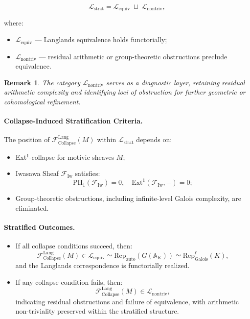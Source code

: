 \documentclass[11pt]{article}
\newtheorem{remark}[theorem]{Remark}
\begin{document}
\[
\mathcal{L}_{\mathrm{strat}} = \mathcal{L}_{\mathrm{equiv}} \;\sqcup\; \mathcal{L}_{\mathrm{nontriv}},
\]

where:

\begin{itemize}
    \item \( \mathcal{L}_{\mathrm{equiv}} \) — Langlands equivalence holds functorially;
    \item \( \mathcal{L}_{\mathrm{nontriv}} \) — residual arithmetic or group-theoretic obstructions preclude equivalence.
\end{itemize}

\begin{remark}
The category \( \mathcal{L}_{\mathrm{nontriv}} \) serves as a diagnostic layer,  
retaining residual arithmetic complexity and identifying loci of obstruction  
for further geometric or cohomological refinement.
\end{remark}

\paragraph{Collapse-Induced Stratification Criteria.}

The position of \( \mathcal{F}_{\mathrm{Collapse}}^{\mathrm{Lang}}(M) \) within \( \mathcal{L}_{\mathrm{strat}} \) depends on:

\begin{itemize}
    \item Ext$^1$-collapse for motivic sheaves \( M \);
    \item Iwasawa Sheaf \( \mathcal{F}_{\mathrm{Iw}} \) satisfies:
    \[
    \mathrm{PH}_1(\mathcal{F}_{\mathrm{Iw}}) = 0, \quad \mathrm{Ext}^1(\mathcal{F}_{\mathrm{Iw}}, -) = 0;
    \]
    \item Group-theoretic obstructions, including infinite-level Galois complexity, are eliminated.
\end{itemize}

\paragraph{Stratified Outcomes.}

\begin{itemize}
    \item If all collapse conditions succeed, then:
    \[
    \mathcal{F}_{\mathrm{Collapse}}^{\mathrm{Lang}}(M) \in \mathcal{L}_{\mathrm{equiv}} \simeq \mathrm{Rep}_{\mathrm{auto}}(G(\mathbb{A}_K)) \simeq \mathrm{Rep}_{\mathrm{Galois}}^\ell(K),
    \]
    and the Langlands correspondence is functorially realized.

    \item If any collapse condition fails, then:
    \[
    \mathcal{F}_{\mathrm{Collapse}}^{\mathrm{Lang}}(M) \in \mathcal{L}_{\mathrm{nontriv}},
    \]
    indicating residual obstructions and failure of equivalence, with arithmetic non-triviality preserved within the stratified structure.
\end{itemize}
\end{document}
